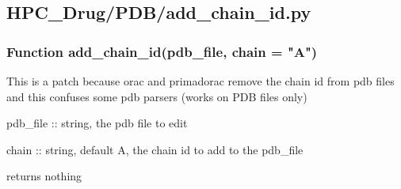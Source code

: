 

\subsection{HPC\_Drug/PDB/add\_chain\_id.py}

    \subsubsection{Function add\_chain\_id(pdb\_file, chain = "A")}
        
        This is a patch because orac and primadorac remove the chain id from
        pdb files and this confuses some pdb parsers (works on PDB files only)

        pdb\_file :: string, the pdb file to edit

        chain :: string, default A, the chain id to add to the pdb\_file

        returns nothing